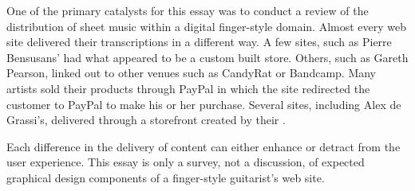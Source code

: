 \documentclass[unicode,hyperfootnotes=false,xetex,colorlinks=true,nofonts,nobib]{tufte-handout}
\newcommand{\textls}[2][5]{%
    \begingroup\addfontfeatures{LetterSpace=#1}#2\endgroup
  }
\renewcommand{\smallcapsspacing}[1]{\textls[10]{#1}}
\renewcommand{\textsc}[1]{\smallcapsspacing{\textsmallcaps{#1}}}
\begin{document}
One of the primary catalysts for this essay was to conduct a review of
the distribution of sheet music within a digital finger-style
domain. Almost every web site delivered their transcriptions in a
different way. A few sites, such as Pierre Bensusans' had what
appeared to be a custom built store. Others, such as Gareth Pearson,
linked out to other venues such as CandyRat or Bandcamp. Many artists
sold their products through PayPal in which the site redirected the
customer to PayPal to make his or her purchase. Several sites,
including Alex de Grassi's, delivered through a storefront created by
their \textsc{cms}.

Each difference in the delivery of content can either enhance or
detract from the user experience. This essay is only a survey, not a
discussion, of expected graphical design components of a finger-style
guitarist's web site.
\end{document}
